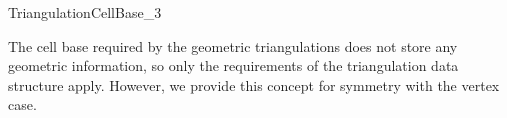 

\begin{ccRefConcept}{TriangulationCellBase_3}

\ccDefinition

The cell base required by the geometric triangulations does not store any
geometric information, so only the requirements of the triangulation data
structure apply.  However, we provide this concept for symmetry with the
vertex case.

\ccRefines {}

\ccHasModels


\ccSeeAlso




\end{ccRefConcept}
